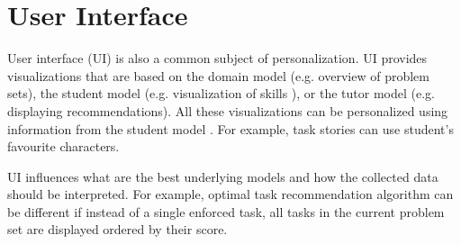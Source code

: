%



\section{User Interface}
\label{sec:user-interface}


User interface (UI) is also a common subject of personalization. %
UI provides visualizations that are based on
the domain model (e.g. overview of problem sets),
the student model (e.g. visualization of skills \cite{open-learner-model}),
or the tutor model (e.g. displaying recommendations). %
All these visualizations can be personalized using
information from the student model
\cite[chapter 9]{its-domain-models}.
For example,
task stories can use student's favourite characters. %

UI influences what are the best underlying models
and how the collected data should be interpreted.
For example, optimal task recommendation algorithm can be
different if instead of a single enforced task,
all tasks in the current problem set are displayed ordered by their score.

